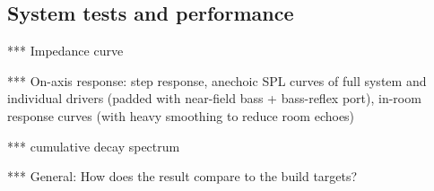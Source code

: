 \documentclass[12pt,a4paper]{article}
\begin{document}
\subsection{System tests and performance}

*** Impedance curve

*** On-axis response: step response, anechoic SPL curves of full system and individual drivers (padded with near-field bass + bass-reflex port), in-room response curves (with heavy smoothing to reduce room echoes)

*** cumulative decay spectrum

*** General: How does the result compare to the build targets?




\end{document}
